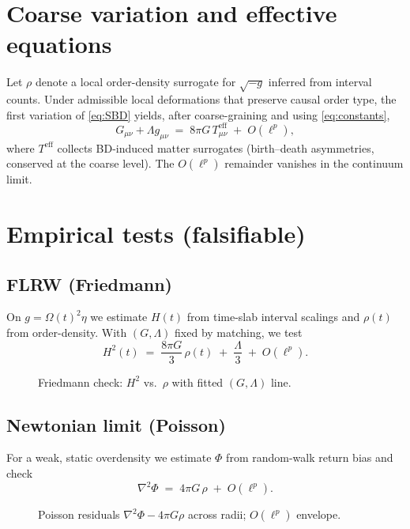 \section{Coarse variation and effective equations}
Let $\rho$ denote a local order-density surrogate for $\sqrt{-g}$ inferred from interval counts. Under admissible local deformations that preserve causal order type, the first variation of \eqref{eq:SBD} yields, after coarse-graining and using \eqref{eq:constants},
\begin{equation}
\label{eq:EFE}
G_{\mu\nu}+\Lambda g_{\mu\nu} \;=\; 8\pi G\,T^{\mathrm{eff}}_{\mu\nu} \;+\; O(\ell^p),
\end{equation}
where $T^{\mathrm{eff}}$ collects BD-induced matter surrogates (birth--death asymmetries, conserved at the coarse level). The $O(\ell^p)$ remainder vanishes in the continuum limit.

\section{Empirical tests (falsifiable)}
\subsection*{FLRW (Friedmann)}
On $g=\Omega(t)^2\eta$ we estimate $H(t)$ from time-slab interval scalings and $\rho(t)$ from order-density. With $(G,\Lambda)$ fixed by matching, we test
\begin{equation}
H^2(t)\;=\;\frac{8\pi G}{3}\,\rho(t)\;+\;\frac{\Lambda}{3}\;+\;O(\ell^p).
\end{equation}
\begin{figure}[H]\centering
{}
\caption{Friedmann check: $H^2$ vs.\ $\rho$ with fitted $(G,\Lambda)$ line.}
\end{figure}

\subsection*{Newtonian limit (Poisson)}
For a weak, static overdensity we estimate $\Phi$ from random-walk return bias and check
\begin{equation}
\nabla^2\Phi \;=\; 4\pi G\,\rho \;+\; O(\ell^p).
\end{equation}
\begin{figure}[H]\centering
{}
\caption{Poisson residuals $\nabla^2\Phi-4\pi G\rho$ across radii; $O(\ell^p)$ envelope.}
\end{figure}

